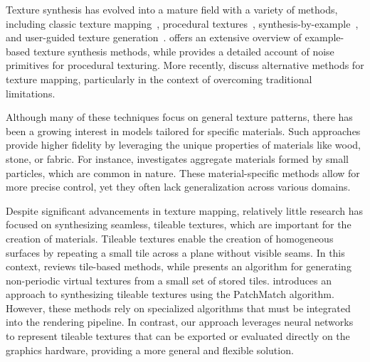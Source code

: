 Texture synthesis has evolved into a mature field with a variety of methods, including classic texture mapping~\citep{blinn76}, procedural textures~\citep{perlin-1985}, synthesis-by-example~\citep{efros99}, and user-guided texture generation~\citep{haeberli90}. \citet{pauly-2009} offers an extensive overview of example-based texture synthesis methods, while \citet{etal-2010} provides a detailed account of noise primitives for procedural texturing. More recently, \citet{rethinkngtex} discuss alternative methods for texture mapping, particularly in the context of overcoming traditional limitations.

Although many of these techniques focus on general texture patterns, there has been a growing interest in models tailored for specific materials. Such approaches provide higher fidelity by leveraging the unique properties of materials like wood, stone, or fabric. For instance, \citet{dorsey-2004} investigates aggregate materials formed by small particles, which are common in nature. These material-specific methods allow for more precise control, yet they often lack generalization across various domains.




Despite significant advancements in texture mapping, relatively little research has focused on synthesizing seamless, tileable textures, which are important for the creation of materials. Tileable textures enable the creation of homogeneous surfaces by repeating a small tile across a plane without visible seams. In this context, \citet{tileinteractive} reviews tile-based methods, while \citet{tilehard} presents an algorithm for generating non-periodic virtual textures from a small set of stored tiles. \citet{Moritz2017Texture} introduces an approach to synthesizing tileable textures using the PatchMatch algorithm. However, these methods rely on specialized algorithms that must be integrated into the rendering pipeline. In contrast, our approach leverages neural networks to represent tileable textures that can be exported or evaluated directly on the graphics hardware, providing a more general and flexible solution.

